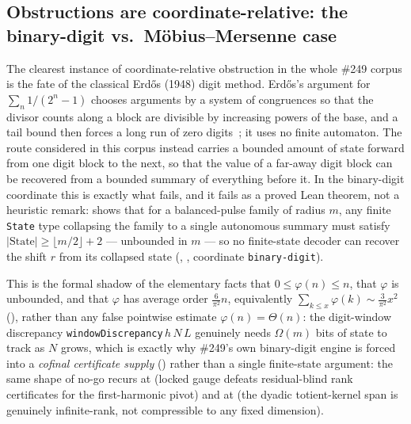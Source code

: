 \subsection{Obstructions are coordinate-relative: the binary-digit vs.\ M\"obius--Mersenne case}

The clearest instance of coordinate-relative obstruction in the whole \#249 corpus is the fate of
the classical Erd\H{o}s (1948) digit method. Erd\H{o}s's argument for $\sum_n1/(2^n-1)$ chooses
arguments by a system of congruences so that the divisor counts along a block are divisible by
increasing powers of the base, and a tail bound then forces a long run of zero
digits~\cite[pp.~63--66]{erdos1948lambert}; it uses no finite automaton. The route considered in
this corpus instead carries a bounded amount of state forward from one digit block to the next, so that the
value of a far-away digit block can be recovered from a bounded summary of everything before it. In
the binary-digit coordinate this is exactly what fails, and it fails as a proved Lean theorem, not
a heuristic remark: 
shows that for a balanced-pulse family of radius $m$, any finite \texttt{State} type collapsing the
family to a single autonomous summary must satisfy $|\mathrm{State}|\ge\lfloor m/2\rfloor+2$ —
unbounded in $m$ — so no finite-state decoder can recover the shift $r$ from its collapsed state
(, , coordinate \texttt{binary-digit}).

This is the formal shadow of the
elementary facts that $0\le\varphi(n)\le n$, that $\varphi$ is unbounded, and
that $\varphi$ has average order $\tfrac6{\pi^2}n$, equivalently
$\sum_{k\le x}\varphi(k)\sim\tfrac3{\pi^2}x^2$ (),
rather than any false pointwise estimate $\varphi(n)=\Theta(n)$: the digit-window discrepancy
\texttt{windowDiscrepancy}$\,h\,N\,L$ genuinely needs $\Omega(m)$ bits of state to track as $N$
grows, which is exactly why \#249's own binary-digit engine is forced into a \emph{cofinal
certificate supply} ()
rather than a single finite-state argument: the same shape of no-go recurs at
 (locked gauge defeats
residual-blind rank certificates for the first-harmonic pivot) and at
 (the dyadic
totient-kernel span is genuinely infinite-rank, not compressible to any fixed dimension).

